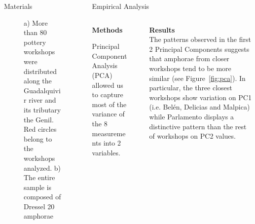 \documentclass[final]{beamer}
\newlength{\sepwid}
\newlength{\onecolwid}
\newlength{\twocolwid}
\begin{document}
\begin{frame}[t]
\begin{columns}[t]
\begin{column}{\onecolwid}
\begin{block}{Materials}
\begin{figure}
\singlespace
\caption{a) More than 80 pottery workshops were distributed along the Guadalquivir river and its tributary the Genil. Red circles belong to the workshops analyzed. b) The entire sample is composed of Dressel 20 amphorae}
\label{fig:betica}
\end{figure}


 \end{block}
\end{column} %

\begin{column}{\twocolwid}


\begin{block}{Empirical Analysis}

\begin{columns}[t,totalwidth=\twocolwid]
\begin{column}{\onecolwid} %


{\textbf{Methods}} 
\justify

Principal Component Analysis (PCA) allowed us to capture most of the variance of the 8 measurements into 2 variables. 


\end{column}

\begin{column}{\sepwid}\end{column} %

\begin{column}{\onecolwid} %

{\textbf{Results}}\\
\justify
The patterns observed in the first 2 Principal Components suggests that amphorae from closer workshops tend to be more similar (see Figure~\ref{fig:pca}). In particular, the three closest workshops show variation on PC1 (i.e. Bel\'en, Delicias and Malpica) while Parlamento displays a distinctive pattern than the rest of workshops on PC2 values.


\end{column}
\end{columns}

\begin{columns}[t,totalwidth=\twocolwid]



\end{columns}
\end{block}
\end{column}
\end{columns}
\end{frame}
\end{document}
